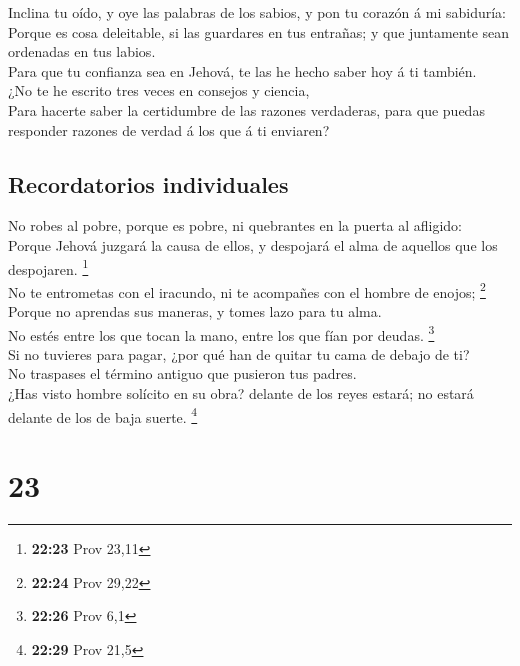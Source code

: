  Inclina tu oído, y oye las palabras de los sabios, y pon
tu corazón á mi sabiduría:\\
 Porque es cosa deleitable, si las guardares en tus
entrañas; y que juntamente sean ordenadas en tus labios.\\
 Para que tu confianza sea en Jehová, te las he hecho saber
hoy á ti también.\\
 ¿No te he escrito tres veces en consejos y ciencia,\\
 Para hacerte saber la certidumbre de las razones
verdaderas, para que puedas responder razones de verdad á los que á ti
enviaren?

\hypertarget{recordatorios-individuales}{%
\subsection{Recordatorios
individuales}\label{recordatorios-individuales}}

 No robes al pobre, porque es pobre, ni quebrantes en la
puerta al afligido:\\
 Porque Jehová juzgará la causa de ellos, y despojará el
alma de aquellos que los despojaren. \footnote{\textbf{22:23} Prov 23,11}\\
 No te entrometas con el iracundo, ni te acompañes con el
hombre de enojos; \footnote{\textbf{22:24} Prov 29,22}\\
 Porque no aprendas sus maneras, y tomes lazo para tu
alma.\\
 No estés entre los que tocan la mano, entre los que fían
por deudas. \footnote{\textbf{22:26} Prov 6,1}\\
 Si no tuvieres para pagar, ¿por qué han de quitar tu cama
de debajo de ti?\\
 No traspases el término antiguo que pusieron tus padres.\\
 ¿Has visto hombre solícito en su obra? delante de los
reyes estará; no estará delante de los de baja suerte. \footnote{\textbf{22:29}
  Prov 21,5}

\hypertarget{section-22}{%
\section{23}\label{section-22}}

